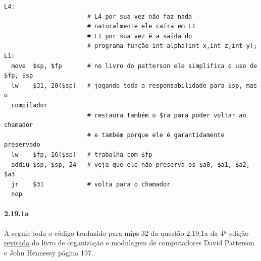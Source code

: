 \documentclass{article}
\begin{document}
\begin{verbatim}
L4:
                       # L4 por sua vez não faz nada
                       # naturalmente ele caíra em L1
                       # L1 por sua vez é a saída do
                       # programa função int alpha(int x,int z,int y);
L1:
  move  $sp, $fp       # no livro do patterson ele simplifica o uso de $fp, $sp
  lw    $31, 20($sp)   # jogando toda a responsabilidade para $sp, mas o
  compilador
                       # restaura também o $ra para poder voltar ao chamador
                       # e também porque ele é garantidamente preservado
  lw    $fp, 16($sp)   # trabalha com $fp
  addiu $sp, $sp, 24   # veja que ele não preserva os $a0, $a1, $a2, $a3
  jr    $31            # volta para o chamador
  nop
\end{verbatim}

\pagebreak
\paragraph{2.19.1a}

A seguir todo o código traduzido para mips 32 da questão 2.19.1a da 4ª edição
\underline{revisada} do livro de organização e modulagem de computadores David
Patterson e John Hennessy página 197.
\end{document}
